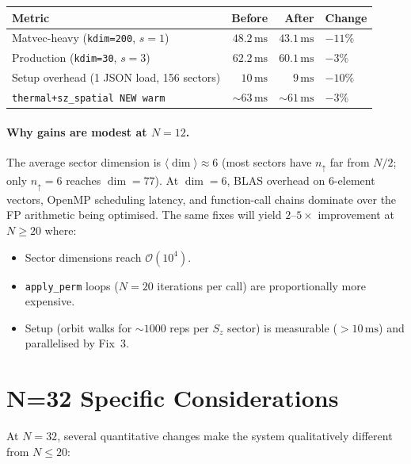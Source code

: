 \documentclass[11pt,a4paper]{article}
\begin{document}
\begin{center}
\begin{tabular}{@{}lrrl@{}}
\toprule
Metric & Before & After & Change \\
\midrule
Matvec-heavy (\texttt{kdim=200}, $s=1$) & $48.2\,\mathrm{ms}$ & $43.1\,\mathrm{ms}$ & $-11\%$ \\
Production (\texttt{kdim=30}, $s=3$)    & $62.2\,\mathrm{ms}$ & $60.1\,\mathrm{ms}$ & $-3\%$  \\
Setup overhead (1 JSON load, 156 sectors) & $10\,\mathrm{ms}$   & $9\,\mathrm{ms}$    & $-10\%$ \\
\texttt{thermal+sz\_spatial NEW warm}   & $\sim 63\,\mathrm{ms}$ & $\sim 61\,\mathrm{ms}$ & $-3\%$ \\
\bottomrule
\end{tabular}
\end{center}

\paragraph{Why gains are modest at $N=12$.}
The average sector dimension is $\langle\dim\rangle \approx 6$ (most sectors
have $n_{\uparrow}$ far from $N/2$; only $n_{\uparrow} = 6$ reaches
$\dim = 77$).  At $\dim = 6$, BLAS overhead on 6-element vectors, OpenMP
scheduling latency, and function-call chains dominate over the FP arithmetic
being optimised.  The same fixes will yield $2$--$5\times$ improvement at
$N \ge 20$ where:
\begin{itemize}[nosep]
  \item Sector dimensions reach $\mathcal{O}(10^4)$.
  \item \texttt{apply\_perm} loops ($N=20$ iterations per call) are
    proportionally more expensive.
  \item Setup (orbit walks for $\sim 1000$ reps per $S_z$ sector) is
    measurable ($>10\,\mathrm{ms}$) and parallelised by Fix~3.
\end{itemize}

\section{N=32 Specific Considerations}
\label{sec:n32}

At $N=32$, several quantitative changes make the system qualitatively
different from $N\le20$:
\end{document}
